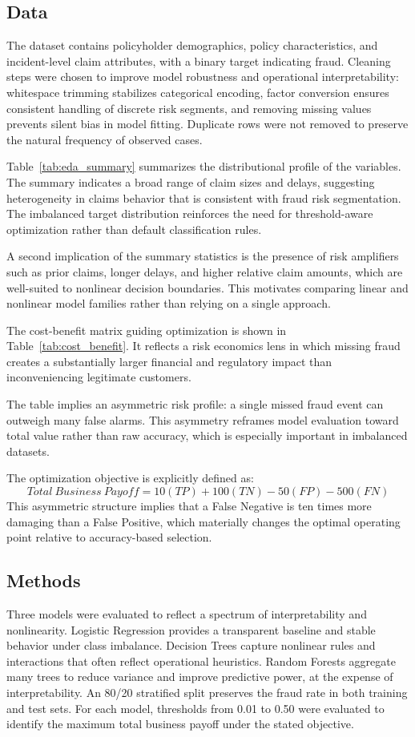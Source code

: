 \subsection{Data}
The dataset contains policyholder demographics, policy characteristics, and incident-level claim attributes, with a binary target indicating fraud. Cleaning steps were chosen to improve model robustness and operational interpretability: whitespace trimming stabilizes categorical encoding, factor conversion ensures consistent handling of discrete risk segments, and removing missing values prevents silent bias in model fitting. Duplicate rows were not removed to preserve the natural frequency of observed cases.

Table~\ref{tab:eda_summary} summarizes the distributional profile of the variables. The summary indicates a broad range of claim sizes and delays, suggesting heterogeneity in claims behavior that is consistent with fraud risk segmentation. The imbalanced target distribution reinforces the need for threshold-aware optimization rather than default classification rules.



A second implication of the summary statistics is the presence of risk amplifiers such as prior claims, longer delays, and higher relative claim amounts, which are well-suited to nonlinear decision boundaries. This motivates comparing linear and nonlinear model families rather than relying on a single approach.

The cost-benefit matrix guiding optimization is shown in Table~\ref{tab:cost_benefit}. It reflects a risk economics lens in which missing fraud creates a substantially larger financial and regulatory impact than inconveniencing legitimate customers.



The table implies an asymmetric risk profile: a single missed fraud event can outweigh many false alarms. This asymmetry reframes model evaluation toward total value rather than raw accuracy, which is especially important in imbalanced datasets.

The optimization objective is explicitly defined as:
$$Total\ Business\ Payoff = 10(TP) + 100(TN) - 50(FP) - 500(FN)$$
This asymmetric structure implies that a False Negative is ten times more damaging than a False Positive, which materially changes the optimal operating point relative to accuracy-based selection.

\subsection{Methods}
Three models were evaluated to reflect a spectrum of interpretability and nonlinearity. Logistic Regression provides a transparent baseline and stable behavior under class imbalance. Decision Trees capture nonlinear rules and interactions that often reflect operational heuristics. Random Forests aggregate many trees to reduce variance and improve predictive power, at the expense of interpretability. An 80/20 stratified split preserves the fraud rate in both training and test sets. For each model, thresholds from 0.01 to 0.50 were evaluated to identify the maximum total business payoff under the stated objective.
